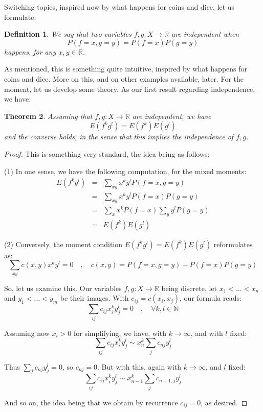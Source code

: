 \documentclass[12pt]{amsbook}
\newtheorem{theorem}{Theorem}[chapter]
\newtheorem{definition}[theorem]{Definition}
\begin{document}
Switching topics, inspired now by what happens for coins and dice, let us formulate: 


\begin{definition}
We say that two variables $f,g:X\to\mathbb R$ are independent when
$$P(f=x,g=y)=P(f=x)P(g=y)$$
happens, for any $x,y\in\mathbb R$.
\end{definition}

As mentioned, this is something quite intuitive, inspired by what happens for coins and dice. More on this, and on other examples available, later. For the moment, let us develop some theory. As our first result regarding independence, we have:


\begin{theorem}
Assuming that $f,g:X\to\mathbb R$ are independent, we have
$$E(f^kg^l)=E(f^k)E(g^l)$$
and the converse holds, in the sense that this implies the independence of $f,g$.
\end{theorem}

\begin{proof}
This is something very standard, the idea being as follows:

\medskip

(1) In one sense, we have the following computation, for the mixed moments:
\begin{eqnarray*}
E(f^kg^l)
&=&\sum_{xy}x^ky^lP(f=x,g=y)\\
&=&\sum_{xy}x^ky^lP(f=x)P(g=y)\\
&=&\sum_xx^kP(f=x)\sum_yy^lP(g=y)\\
&=&E(f^k)E(g^l)
\end{eqnarray*}

(2) Conversely, the moment condition $E(f^kg^l)=E(f^k)E(g^l)$ reformulates as:
$$\sum_{xy}c(x,y)x^ky^l=0\quad,\quad 
c(x,y)=P(f=x,g=y)-P(f=x)P(g=y)$$

So, let us examine this. Our variables $f,g:X\to\mathbb R$ being discrete, let $x_1<\ldots<x_n$ and $y_1<\ldots<y_m$ be their images. With $c_{ij}=c(x_i,x_j)$, our formula reads:
$$\sum_{ij}c_{ij}x_i^ky_j^l=0\quad,\quad\forall k,l\in\mathbb N$$

Assuming now $x_i>0$ for simplifying, we have, with $k\to\infty$, and with $l$ fixed:
$$\sum_{ij}c_{ij}x_i^ky_j^l\sim x_n^k\sum_jc_{nj}y_j^l$$

Thus $\sum_jc_{nj}y_j^l=0$, so $c_{nj}=0$. But with this, again with $k\to\infty$, and $l$ fixed:
$$\sum_{ij}c_{ij}x_i^ky_j^l\sim x_{n-1}^k\sum_jc_{n-1,j}y_j^l$$

And so on, the idea being that we obtain by recurrence $c_{ij}=0$, as desired.
\end{proof}
\end{document}
